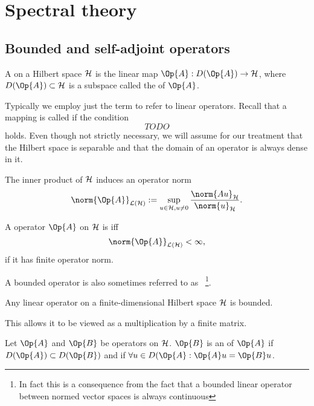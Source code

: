 \section{Spectral theory}

\subsection{Bounded and self-adjoint operators}

\begin{defn}
	A  on a Hilbert space $\mathcal{H}$
	is the linear map $\Op{A} : D(\Op{A}) \to \hilbert$,
	where $D(\Op{A}) \subset \hilbert$ is a subspace
	called the  of $\Op{A}$.
\end{defn}
Typically we employ just the term  to refer to linear operators.
Recall that a mapping is called  if the condition
\[ TODO \]
holds.
Even though not strictly necessary, we will assume for our treatment
that the Hilbert space is separable and that the domain of an operator
is always dense in it.

\newcommand{\opnorm}[1]{\norm{#1}_{\mathcal{L}(\hilbert)}}
\begin{defn}
	The inner product of $\mathcal{H}$ induces an operator norm
	\[ \opnorm{\Op{A}} := \sup_{u \in \hilbert, u\neq0} \frac{\norm{A u}_\hilbert}{\norm{u}_{\hilbert}}. \]
\end{defn}

\begin{defn}
	A operator $\Op{A}$ on $\mathcal{H}$ is  iff
	\[ \opnorm{\Op{A}} < \infty, \]
	\ie if it has finite operator norm.
\end{defn}
A bounded operator is also sometimes referred to as %
~\footnote{In fact this is a consequence from the fact that a bounded linear operator
between normed vector spaces is always continuous}.

\begin{prop}
	Any linear operator on a finite-dimensional Hilbert space $\mathcal{H}$ is bounded.
\end{prop}
This allows it to be viewed as a multiplication by a finite matrix.

\begin{defn}
	Let $\Op{A}$ and $\Op{B}$ be operators on $\mathcal{H}$.
	$\Op{B}$ is an  of $\Op{A}$ if $D(\Op{A}) \subset D(\Op{B})$
	and if $\forall u \in D(\Op{A}: \Op{A}u = \Op{B}u$.
\end{defn}

